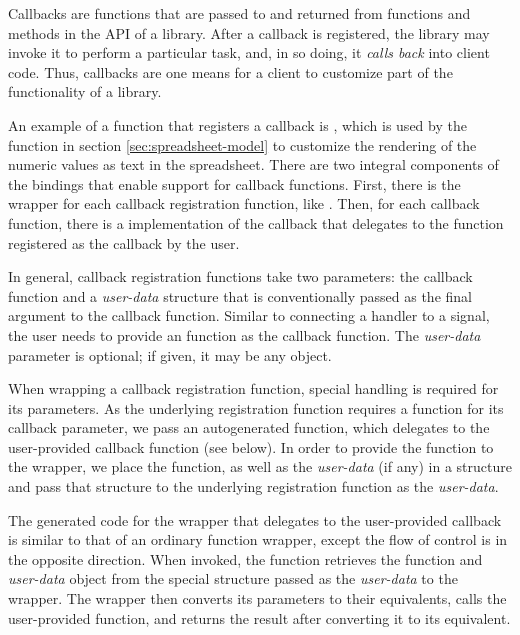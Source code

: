 \documentclass[article,shortnames]{jss}
\begin{document}

Callbacks are functions that are passed to and returned from functions
and methods in the API of a library. After a callback is registered,
the library may invoke it to perform a particular task, and, in so
doing, it \emph{calls back} into client code. Thus, callbacks are one
means for a client to customize part of the functionality of a
library.

An example of a function that registers a callback is
, which is used by the
 function in section
\ref{sec:spreadsheet-model} to customize the rendering of the numeric
values as text in the spreadsheet. There are two integral components
of the bindings that enable support for callback functions. First,
there is the wrapper for each callback registration function, like
. Then, for each callback
function, there is a  implementation of the callback that
delegates to the  function registered as the callback by
the user.

In general, callback registration functions take two parameters: the
callback function and a \emph{user-data} structure that is
conventionally passed as the final argument to the callback function.
Similar to connecting a handler to a signal, the user needs to provide
an  function as the callback function. The
\emph{user-data} parameter is optional; if given, it may be any
 object.

When wrapping a callback registration function, special handling is
required for its parameters. As the underlying 
registration function requires a  function for its
callback parameter, we pass an autogenerated  function,
which delegates to the user-provided  callback function
(see below). In order to provide the   function to the
 wrapper, we place the  function, as well as
the  \emph{user-data} (if any) in a structure and pass
that structure to the underlying  registration function as
the \emph{user-data}.

The generated code for the  wrapper that delegates to the
user-provided  callback is similar to that of an ordinary
function wrapper, except the flow of control is in the opposite
direction. When invoked, the function retrieves the 
function and \emph{user-data} object from the special structure passed
as the \emph{user-data} to the wrapper. The wrapper then converts its
parameters to their  equivalents, calls the user-provided
 function, and returns the result after converting it to
its  equivalent.
\end{document}
